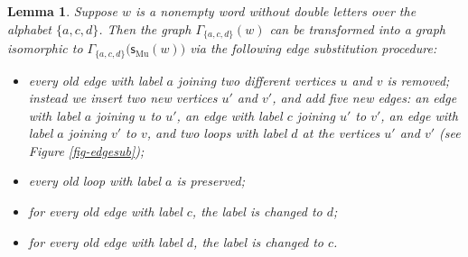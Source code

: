 \documentclass[12pt]{article}
\newtheorem{lemma}[theorem]{Lemma}
\theoremstyle{definition}
\def\subst{\mathsf{s}}
\def\sub{\subst_{\mathrm{Mu}}}
\begin{document}
\begin{lemma}\label{edge-sub}
Suppose $w$ is a nonempty word without double letters over the alphabet 
$\{a,c,d\}$.  Then the graph $\Gamma_{\{a,c,d\}}(w)$ can be transformed 
into a graph isomorphic to $\Gamma_{\{a,c,d\}}\bigl(\sub(w)\bigr)$ via the 
following edge substitution procedure:
\begin{itemize}
\item
every old edge with label $a$ joining two different vertices $u$ and $v$ is 
removed; instead we insert two new vertices $u'$ and $v'$, and add five new 
edges: an edge with label $a$ joining $u$ to $u'$, an edge with label $c$ 
joining $u'$ to $v'$, an edge with label $a$ joining $v'$ to $v$, and two 
loops with label $d$ at the vertices $u'$ and $v'$ (see Figure 
\ref{fig-edgesub});

\item
every old loop with label $a$ is preserved;

\item
for every old edge with label $c$, the label is changed to $d$;

\item
for every old edge with label $d$, the label is changed to $c$.
\end{itemize}
\end{lemma}
\end{document}
